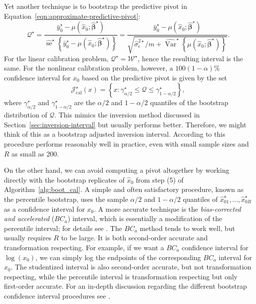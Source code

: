 \documentclass[cmfont,usenames,dvipsnames,leqno]{afit-etd}\usepackage[]{graphicx}\usepackage[]{color}
\newcommand{\boot}{\star} %
\newcommand{\mc}[1]{\ensuremath{\mathcal{#1}}}
\newcommand{\wh}[1]{\ensuremath{\widehat{#1}}}
\newcommand{\var}{\operatorname{Var}}
\newcommand{\se}{\operatorname{se}}
\begin{document}
Yet another technique \citep{jones_bootstrapping_1999, huet_statistical_2004} is to bootstrap the predictive pivot in Equation~\eqref{eqn:approximate-predictive-pivot}:
\begin{equation*}
  \mc{Q}^{\boot} = \frac{\bar{y}_0^\boot - \mu\left(\wh{x}_0; \wh{\bm{\beta}}^\boot\right)}{\wh{\se}^\boot\left\{\bar{y}_0^\boot - \mu\left(\wh{x}_0; \wh{\bm{\beta}}^\boot\right)\right\}} = \frac{\bar{y}_0^\boot - \mu\left(\wh{x}_0; \wh{\bm{\beta}}^\boot\right)}{\sqrt{\wh{\sigma}_\epsilon^{2\boot}/m + \wh{\var}^\boot\left\{\mu\left(\wh{x}_0; \wh{\bm{\beta}}^\boot\right)\right\}}}.
\end{equation*}
For the linear calibration problem, $\mc{Q}^\boot = \mc{W}^\boot$, hence the resulting interval is the same. For the nonlinear calibration problem, however, a $100(1-\alpha)\%$ confidence interval for $x_0$ based on the predictive pivot is given by the set
\begin{equation*}
	\mc{J}_\mathrm{cal}^\boot(x) = \left\{x: \gamma_{\alpha/2}^\boot \le \mc{Q} \le \gamma_{1-\alpha/2}^\boot\right\},
\end{equation*}
where $\gamma_{\alpha/2}^\boot$ and $\gamma_{1-\alpha/2}^\boot$ are the $\alpha/2$ and $1-\alpha/2$ quantiles of the bootstrap distribution of $\mc{Q}$. This mimics the inversion method discussed in Section~\ref{sec:inversion-interval} but usually performs better. Therefore, we might think of this as a bootstrap adjusted inversion interval. According to \citet{huet_statistical_2004} this procedure performs reasonably well in practice, even with small sample sizes and $R$ as small as 200.

On the other hand, we can avoid computing a pivot altogether by working directly with the bootstrap replicates of $\wh{x}_0$ from step (5) of Algorithm~\ref{alg:boot_cal}. A simple and often satisfactory procedure, known as the percentile bootstrap, uses the sample $\alpha/2$ and $1 - \alpha/2$ quantiles of $\wh{x}_{01}^\boot, \dotsc, \wh{x}_{0R}^\boot$ as a confidence interval for $x_0$. A more accurate technique is the \textit{bias-corrected and accelerated} ($BC_a$) interval, which is essentially a modification of the percentile interval; for details see \citet[chap. 14, sec. 3]{efron_boot_1994}. The $BC_a$ method tends to work well, but usually requires $R$ to be large. It is both second-order accurate \citep[pp. 187]{efron_boot_1994} and transformation respecting. For example, if we want a $BC_a$ confidence interval for $\log(x_0)$, we can simply log the endpoints of the corresponding $BC_a$ interval for $x_0$. The studentized interval is also second-order accurate, but not transformation respecting, while the percentile interval is transformation respecting but only first-order accurate. For an in-depth discussion regarding the different bootstrap confidence interval procedures see \citet[chap. 5]{davison_bootstrap_1997}.
\end{document}
